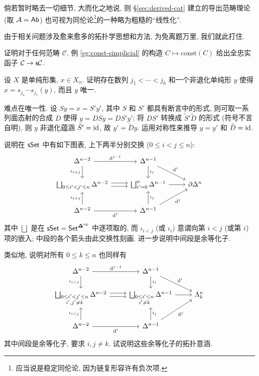 倘若暂时略去一切细节, 大而化之地说, 则 \S\ref{sec:derived-cat} 建立的导出范畴理论 (取 $\mathcal{A} = \mathsf{Ab}$) 也可视为同伦论\footnote{应当说是稳定同伦论, 因为链复形容许有负次项.}的一种略为粗糙的``线性化''.

由于相关问题涉及愈来愈多的拓扑学思想和方法, 为免离题万里, 我们就此打住.

\begin{Exercises}
	\item 证明对于任何范畴 $\mathcal{C}$, 例 \ref{eg:const-simplicial} 的构造 $C \mapsto \mathrm{const}(C)$ 给出全忠实函子 $\mathcal{C} \to \mathsf{s}\mathcal{C}$.
	
	\item 设 $X$ 是单纯形集, $x \in X_n$. 证明存在数列 $j_1 < \cdots < j_h$ 和一个非退化单纯形 $y$ 使得 $x = s_{j_h} \cdots s_{j_1} (y)$, 而且 $y$ 唯一.
	
	\begin{hint}
		难点在唯一性. 设 $Sy = x = S' y'$, 其中 $S$ 和 $S'$ 都具有断言中的形式, 则可取一系列面态射的合成 $D$ 使得 $y = DS y = DS' y'$; 将 $DS'$ 转换成 $\tilde{S}'\tilde{D}$ 的形式 (符号不言自明), 则 $y$ 非退化蕴涵 $\tilde{S}' = \mathrm{id}$, 故 $y' = \tilde{D}y$. 运用对称性来推导 $y = y'$ 和 $\tilde{D} = \mathrm{id}$.
	\end{hint}
	
	\item 说明在 $\mathsf{sSet}$ 中有如下图表, 上下两半分别交换 ($0 \leq i < j \leq n$):
	\[\begin{tikzcd}
		\Delta^{n-2} \arrow[d, "{\iota_{i < j}}"'] \arrow[r, "{\mathrm{d}^{j-1}}"] & \Delta^{n-1} \arrow[d, "\iota_i"] \arrow[rd, "{\mathrm{d}^i}"] & \\
		\bigsqcup_{0 \leq i' < j' \leq n} \Delta^{n-2} \arrow[shift left, r] \arrow[shift right, r] & \bigsqcup_{i' = 0}^n \Delta^{n-1} \arrow[r] & \partial \Delta^n \\
		\Delta^{n-2} \arrow[u, "{\iota_{i < j}}"] \arrow[r, "{\mathrm{d}^i}"'] & \Delta^{n-1} \arrow[u, "\iota_j"'] \arrow[ru, "{\mathrm{d}^j}"'] &
	\end{tikzcd}\]
	其中 $\bigsqcup$ 是在 $\mathsf{sSet} = \mathsf{Set}^{\bm\Delta^{\operatorname{op}}}$ 中逐项取的, 而 $\iota_{i < j}$ (或 $\iota_i$) 意谓向第 $i < j$ (或第 $i$) 项的嵌入; 中段的各个箭头由此交换性刻画. 进一步说明中间段是余等化子.
	
	类似地, 说明对所有 $0 \leq k \leq n$ 也同样有
	\[\begin{tikzcd}
		\Delta^{n-2} \arrow[d, "{\iota_{i < j}}"'] \arrow[r, "{\mathrm{d}^{j-1}}"] & \Delta^{n-1} \arrow[d, "\iota_i"] \arrow[rd, "{\mathrm{d}^i}"] & \\
		\bigsqcup_{\substack{0 \leq i' < j' \leq n \\ i', j' \neq k}} \Delta^{n-2} \arrow[shift left, r] \arrow[shift right, r] & \bigsqcup_{\substack{0 \leq i' \leq n \\ i' \neq k}} \Delta^{n-1} \arrow[r] & \Lambda^n_k \\
		\Delta^{n-2} \arrow[u, "{\iota_{i < j}}"] \arrow[r, "{\mathrm{d}^i}"'] & \Delta^{n-1} \arrow[u, "\iota_j"'] \arrow[ru, "{\mathrm{d}^j}"'] &
	\end{tikzcd}\]
	其中间段是余等化子, 要求 $i, j \neq k$. 试说明这些余等化子的拓扑意涵.
	

\end{Exercises}
